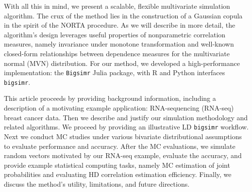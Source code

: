 \documentclass[
]{jss}
\begin{document}
With all this in mind, we present a scalable, flexible multivariate
simulation algorithm. The crux of the method lies in the construction of
a Gaussian copula in the spirit of the NORTA procedure. As we will
describe in more detail, the algorithm's design leverages useful
properties of nonparametric correlation measures, namely invariance
under monotone transformation and well-known closed-form relationships
between dependence measures for the multivariate normal (MVN)
distribution. For our method, we developed a high-performance
implementation: the \texttt{Bigsimr} Julia package, with R and Python
interfaces \texttt{bigsimr}.

This article proceeds by providing background information, including a
description of a motivating example application: RNA-sequencing
(RNA-seq) breast cancer data. Then we describe and justify our
simulation methodology and related algorithms. We proceed by providing
an illustrative LD \texttt{bigsimr} workflow. Next we conduct MC studies
under various bivariate distributional assumptions to evaluate
performance and accuracy. After the MC evaluations, we simulate random
vectors motivated by our RNA-seq example, evaluate the accuracy, and
provide example statistical computing tasks, namely MC estimation of
joint probabilities and evaluating HD correlation estimation efficiency.
Finally, we discuss the method's utility, limitations, and future
directions.


\end{document}
